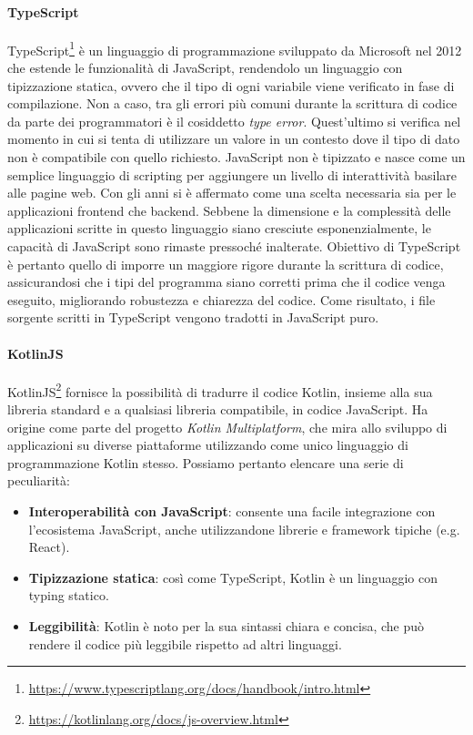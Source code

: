 \paragraph{TypeScript}
TypeScript\footnote{\url{https://www.typescriptlang.org/docs/handbook/intro.html}} è un linguaggio di programmazione sviluppato da Microsoft nel 2012 che estende le funzionalità di JavaScript, rendendolo un linguaggio con tipizzazione statica, ovvero che il tipo di ogni variabile viene verificato in fase di compilazione. Non a caso, tra gli errori più comuni durante la scrittura di codice da parte dei programmatori è il cosiddetto \textit{type error}. Quest'ultimo si verifica nel momento in cui si tenta di utilizzare un valore in un contesto dove il tipo di dato non è compatibile con quello richiesto. 
JavaScript non è tipizzato e nasce come un semplice linguaggio di scripting per aggiungere un livello di interattività basilare alle pagine web. Con gli anni si è affermato come una scelta necessaria sia per le applicazioni frontend che backend. Sebbene la dimensione e la complessità delle applicazioni scritte in questo linguaggio siano cresciute esponenzialmente, le capacità di JavaScript sono rimaste pressoché inalterate. Obiettivo di TypeScript è pertanto quello di imporre un maggiore rigore durante la scrittura di codice, assicurandosi che i tipi del programma siano corretti prima che il codice venga eseguito, migliorando robustezza e chiarezza del codice. Come risultato, i file sorgente scritti in TypeScript vengono tradotti in JavaScript puro.
\paragraph{KotlinJS}
KotlinJS\footnote{\url{https://kotlinlang.org/docs/js-overview.html}} fornisce la possibilità di tradurre il codice Kotlin, insieme alla sua libreria standard e a qualsiasi libreria compatibile, in codice JavaScript. Ha origine come parte del progetto \textit{Kotlin Multiplatform}, che mira allo sviluppo di applicazioni su diverse piattaforme utilizzando come unico linguaggio di programmazione Kotlin stesso. Possiamo pertanto elencare una serie di peculiarità:
\begin{itemize}
	\item \textbf{Interoperabilità con JavaScript}:  consente una facile integrazione con l'ecosistema JavaScript, anche utilizzandone librerie e framework tipiche (e.g. React). 
	\item \textbf{Tipizzazione statica}: così come TypeScript, Kotlin è un linguaggio con typing statico.
	\item \textbf{Leggibilità}: Kotlin è noto per la sua sintassi chiara e concisa, che può rendere il codice più leggibile rispetto ad altri linguaggi.
\end{itemize}

